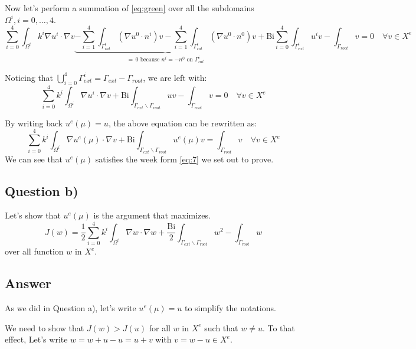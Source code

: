 \documentclass[
	english,
	11pt, %
]{fphw}
\newcommand{\bi}{\text{Bi}}
\begin{document}
\noindent Now let's perform a summation of \eqref{eq:green} over all the subdomains $\Omega^i, i=0,\ldots,4$.
$$
\sum_{i=0}^4 \int_{\Omega^i}k^i \nabla u^i \cdot \nabla v \underbrace{- \sum_{i=1}^4 \int_{\Gamma_{int}^i}  \left( \nabla u^0 \cdot n^i \right) v - \sum_{i=1}^4 \int_{\Gamma_{int}^i}  \left( \nabla u^0 \cdot n^0 \right) v}_{=\, 0 \text{ because } n^i = -n^0 \text{ on } \Gamma_{int}^i} + \bi \sum_{i=0}^4 \int_{\Gamma_{ext}^i} u^i v -\int_{\Gamma_{root}} v  = 0 \quad \forall v \in X^e 
$$

\noindent Noticing that $\bigcup_{i=0}^4 \Gamma_{ext}^i = \Gamma_{ext} - \Gamma_{root}$, we are left with:
$$
\sum_{i=0}^4 k^i \int_{\Omega^i} \nabla u^i \cdot \nabla v + \bi \int_{\Gamma_{ext} \backslash \Gamma_{root}} u v -\int_{\Gamma_{root}} v  = 0 \quad \forall v \in X^e 
$$

\noindent By writing back $u^e({\mu}) = u$, the above equation can be rewritten as:
$$
\sum_{i=0}^4 k^i \int_{\Omega^i} \nabla u^e({\mu}) \cdot \nabla v + \bi \int_{\Gamma_{ext} \backslash \Gamma_{root}} u^e({\mu}) v = \int_{\Gamma_{root}} v \quad \forall v \in X^e 
$$
We can see that $u^e({\mu})$ satisfies the week form \eqref{eq:7} we set out to prove.




\subsection*{Question b)}
\begin{problem}
	Let's show that $u^e(\mu)$ is the argument that maximizes.
	\begin{equation}
		\tag{8}\label{eq:J}
		J(w) = \frac{1}{2} \sum_{i=0}^4 k^i \int_{\Omega^i} \nabla w \cdot \nabla w + \frac{\bi}{2} \int_{\Gamma_{ext} \backslash \Gamma_{root}} w^2 -\int_{\Gamma_{root}} w
	\end{equation}
	over all function $w$ in $X^e$.
\end{problem}


\subsection*{Answer} 

As we did in Question a), let's write $u^e(\mu) = u$ to simplify the notations. 

\noindent We need to show that $J(w)>J(u)$ for all $w$ in $X^e$ such that $w \neq u$. 
To that effect, Let's write $w = w + u - u = u + v$ with $v = w-u \in X^e$. 
\end{document}

